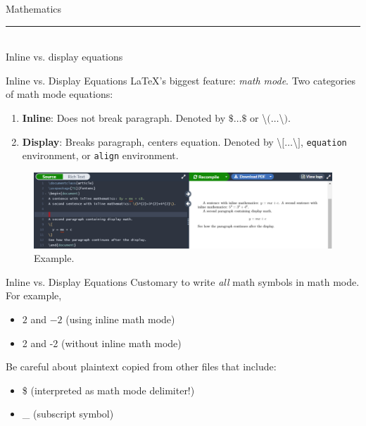 \documentclass{beamer}
\begin{document}
{  \begin{frame}[plain]
    \vfill
    \centering
    \begin{beamercolorbox}[sep=8pt,center,shadow=true,rounded=true]{Mathematics}
      \insertsectionhead\par%
      \color{davisblue}\noindent\rule{10cm}{1pt} \\
      \footnotesize{Inline vs. display equations}
    \end{beamercolorbox}
    \vfill
  \end{frame}

  \begin{frame}{Inline vs. Display Equations}
    \LaTeX's biggest feature: \emph{math mode}. Two categories of math mode equations:
    \begin{enumerate}
      \item \textbf{Inline}: Does not break paragraph. Denoted by $\$\dots\$$ or \textbackslash$(\dots$\textbackslash$)$.
      \item \textbf{Display}: Breaks paragraph, centers equation. Denoted by \textbackslash$[\dots$\textbackslash$]$, \texttt{equation} environment, or \texttt{align} environment.
    \end{enumerate}
    \begin{figure}
      \includegraphics[width=0.9\linewidth]{day02-01A-inline-vs-display.png}
      \caption{Example.}
      \label{fig:day02-01}
    \end{figure}
  \end{frame}

  \begin{frame}{Inline vs. Display Equations}
    Customary to write \emph{all} math symbols in math mode. For example,
    \begin{itemize} 
      \item $2$ and $-2$ (using inline math mode)
      \item 2 and -2 (without inline math mode)
    \end{itemize}
    Be careful about plaintext copied from other files that include:
    \begin{itemize}
      \item \$ (interpreted as math mode delimiter!)
      \item \_ (subscript symbol)
    \end{itemize}
  \end{frame}

}
\end{document}
